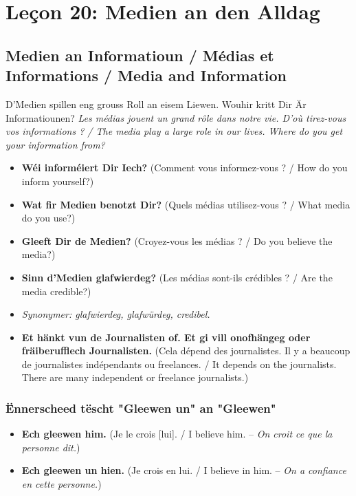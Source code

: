 \chapter{Leçon 20: Medien an den Alldag}

\section{Medien an Informatioun / Médias et Informations / Media and Information}

D'Medien spillen eng grouss Roll an eisem Liewen. Wouhir kritt Dir Är Informatiounen? \textit{Les médias jouent un grand rôle dans notre vie. D'où tirez-vous vos informations ? / The media play a large role in our lives. Where do you get your information from?}

\begin{itemize}
    \item \textbf{Wéi informéiert Dir Iech?} (Comment vous informez-vous ? / How do you inform yourself?)
    \item \textbf{Wat fir Medien benotzt Dir?} (Quels médias utilisez-vous ? / What media do you use?)
    \item \textbf{Gleeft Dir de Medien?} (Croyez-vous les médias ? / Do you believe the media?)
    \item \textbf{Sinn d'Medien glafwierdeg?} (Les médias sont-ils crédibles ? / Are the media credible?)
    \item \textit{Synonymer: glafwierdeg, glafwürdeg, credibel.}
    \item \textbf{Et hänkt vun de Journalisten of. Et gi vill onofhängeg oder fräiberufflech Journalisten.} (Cela dépend des journalistes. Il y a beaucoup de journalistes indépendants ou freelances. / It depends on the journalists. There are many independent or freelance journalists.)
\end{itemize}

\subsection{Ënnerscheed tëscht "Gleewen un" an "Gleewen"}
\begin{itemize}
    \item \textbf{Ech gleewen him.} (Je le crois [lui]. / I believe him. -- \textit{On croit ce que la personne dit.})
    \item \textbf{Ech gleewen un hien.} (Je crois en lui. / I believe in him. -- \textit{On a confiance en cette personne.})
\end{itemize}

